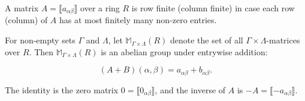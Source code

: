A matrix $A = \llbracket a_{\alpha\beta} \rrbracket$ over a ring $R$ is row finite (column finite) in case each row (column) of $A$ has at most finitely many non-zero entries.

For non-empty sets $\Gamma$ and $\Lambda$, let $\mathbb{M}_{\Gamma \times \Lambda}(R)$ denote the set of all $\Gamma \times \Lambda$-matrices over $R$. Then $\mathbb{M}_{\Gamma \times \Lambda}(R)$ is an abelian group under entrywise addition:

$$(A + B)(\alpha, \beta) = a_{\alpha\beta} + b_{\alpha\beta}.$$

The identity is the zero matrix $0 = \llbracket 0_{\alpha\beta} \rrbracket$, and the inverse of $A$ is $-A = \llbracket -a_{\alpha\beta} \rrbracket$.
